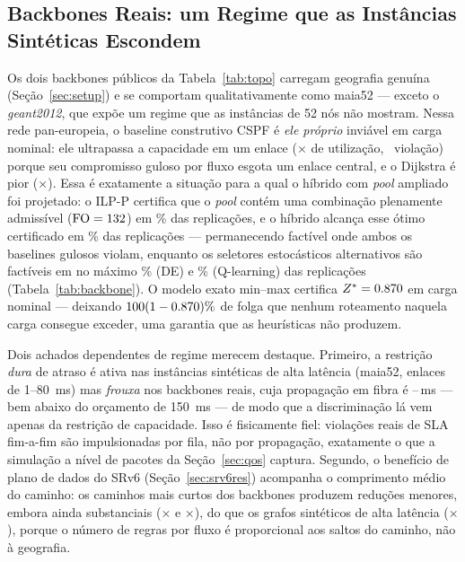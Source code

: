 \documentclass[journal]{IEEEtran}
\newcommand{\FO}{\mathrm{FO}}
\begin{document}
\subsection{Backbones Reais: um Regime que as Instâncias Sintéticas Escondem}
\label{sec:backbone}
Os dois backbones públicos da Tabela~\ref{tab:topo} carregam geografia
genuína (Seção~\ref{sec:setup}) e se comportam qualitativamente como maia52
--- exceto o \emph{geant2012}, que expõe um regime que as instâncias de 52
nós não mostram. Nessa rede pan-europeia, o baseline construtivo CSPF é
\emph{ele próprio} inviável em carga nominal: ele ultrapassa a capacidade em
um enlace (\AntCspfMaxUtil$\times$ de utilização, \AntCspfViol\ violação)
porque seu compromisso guloso por fluxo esgota um enlace central, e o
Dijkstra é pior (\AntDjMaxUtil$\times$). Essa é exatamente a situação para a
qual o híbrido com \emph{pool} ampliado foi projetado: o ILP-P certifica que
o \emph{pool} contém uma combinação plenamente admissível
($\FO=\AntPoolOpt$) em \AntPoolOptFeasRate\% das replicações, e o híbrido
alcança esse ótimo certificado em \AntGaFeas\% das replicações ---
permanecendo factível onde ambos os baselines gulosos violam, enquanto os
seletores estocásticos alternativos são factíveis em no máximo \AntDeFeas\%
(DE) e \AntQlFeas\% (Q-learning) das replicações (Tabela~\ref{tab:backbone}). O
modelo exato min--max certifica $Z^{*}=0.870$ em carga nominal --- deixando
$100(1-0.870)\%$ de folga que nenhum roteamento naquela carga consegue
exceder, uma garantia que as heurísticas não produzem.

Dois achados dependentes de regime merecem destaque. Primeiro, a restrição
\emph{dura} de atraso é ativa nas instâncias sintéticas de alta latência
(maia52, enlaces de 1--80~ms) mas \emph{frouxa} nos backbones reais, cuja
propagação em fibra é \AntDelayGeantMin--\AntDelayGeantMax\,ms --- bem abaixo
do orçamento de 150~ms --- de modo que a discriminação lá vem apenas da
restrição de capacidade. Isso é fisicamente fiel: violações reais de SLA
fim-a-fim são impulsionadas por fila, não por propagação, exatamente o que a
simulação a nível de pacotes da Seção~\ref{sec:qos} captura. Segundo, o
benefício de plano de dados do SRv6 (Seção~\ref{sec:srv6res}) acompanha o
comprimento médio do caminho: os caminhos mais curtos dos backbones produzem
reduções menores, embora ainda substanciais (\SrvRedGer$\times$ e
\SrvRedGeant$\times$), do que os grafos sintéticos de alta latência
(\SrvRedMaia$\times$), porque o número de regras por fluxo é proporcional aos
saltos do caminho, não à geografia.
\end{document}
